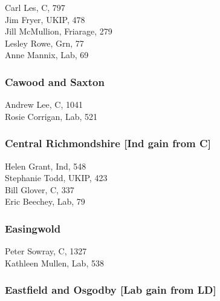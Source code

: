 \documentclass[a4paper,openany,10pt]{book}
\begin{document}


Carl Les, C, 797\\
Jim Fryer, UKIP, 478\\
Jill McMullion, Friarage, 279\\
Lesley Rowe, Grn, 77\\
Anne Mannix, Lab, 69\\


\subsubsection*{Cawood and Saxton}



Andrew Lee, C, 1041\\
Rosie Corrigan, Lab, 521\\


\subsubsection*{Central Richmondshire \hspace*{\fill}\nolinebreak[1]%
\enspace\hspace*{\fill}
[Ind gain from C]}



Helen Grant, Ind, 548\\
Stephanie Todd, UKIP, 423\\
Bill Glover, C, 337\\
Eric Beechey, Lab, 79\\


\subsubsection*{Easingwold}



Peter Sowray, C, 1327\\
Kathleen Mullen, Lab, 538\\


\subsubsection*{Eastfield and Osgodby \hspace*{\fill}\nolinebreak[1]%
\enspace\hspace*{\fill}
[Lab gain from LD]}
\end{document}
